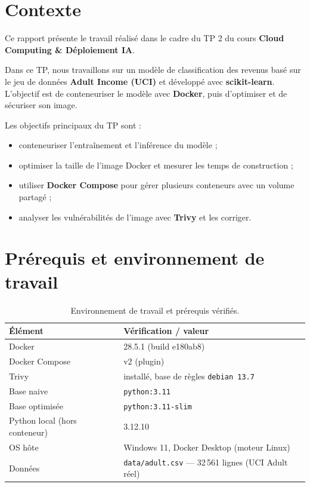 \documentclass[11pt,a4paper]{report}
\begin{document}
\section{Contexte}

Ce rapport présente le travail réalisé dans le cadre du TP 2 du cours
\textbf{Cloud Computing \& Déploiement IA}.

Dans ce TP, nous travaillons sur un modèle de classification des revenus basé
sur le jeu de données \textbf{Adult Income (UCI)} et développé avec
\textbf{scikit-learn}. L'objectif est de conteneuriser le modèle avec
\textbf{Docker}, puis d'optimiser et de sécuriser son image.

Les objectifs principaux du TP sont :

\begin{itemize}
    \item conteneuriser l'entraînement et l'inférence du modèle ;
    \item optimiser la taille de l'image Docker et mesurer les temps de construction ;
    \item utiliser \textbf{Docker Compose} pour gérer plusieurs conteneurs avec un volume partagé ;
    \item analyser les vulnérabilités de l'image avec \textbf{Trivy} et les corriger.
\end{itemize}

\section{Prérequis et environnement de travail}

\begin{table}[H]
\centering\small
\begin{tabular}{@{}p{4.6cm}p{9.4cm}@{}}
\toprule
\textbf{Élément} & \textbf{Vérification / valeur} \\
\midrule
Docker & 28.5.1 (build e180ab8) \\
Docker Compose & v2 (plugin) \\
Trivy & installé, base de règles \texttt{debian 13.7} \\
Base naive & \texttt{python:3.11} \\
Base optimisée & \texttt{python:3.11-slim} \\
Python local (hors conteneur) & 3.12.10 \\
OS hôte & Windows 11, Docker Desktop (moteur Linux) \\
Données & \texttt{data/adult.csv} --- 32\,561 lignes (UCI Adult réel) \\
\end{tabular}
\caption{Environnement de travail et prérequis vérifiés.}
\end{table}
\end{document}
